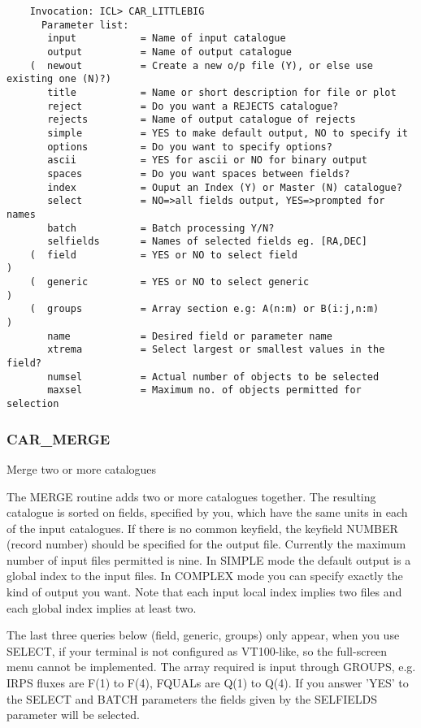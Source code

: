 \begin{verbatim}
    Invocation: ICL> CAR_LITTLEBIG
      Parameter list:
       input           = Name of input catalogue
       output          = Name of output catalogue
    (  newout          = Create a new o/p file (Y), or else use existing one (N)?)
       title           = Name or short description for file or plot
       reject          = Do you want a REJECTS catalogue?
       rejects         = Name of output catalogue of rejects
       simple          = YES to make default output, NO to specify it
       options         = Do you want to specify options?
       ascii           = YES for ascii or NO for binary output
       spaces          = Do you want spaces between fields?
       index           = Ouput an Index (Y) or Master (N) catalogue?
       select          = NO=>all fields output, YES=>prompted for names
       batch           = Batch processing Y/N?
       selfields       = Names of selected fields eg. [RA,DEC]
    (  field           = YES or NO to select field                               )
    (  generic         = YES or NO to select generic                             )
    (  groups          = Array section e.g: A(n:m) or B(i:j,n:m)                 )
       name            = Desired field or parameter name
       xtrema          = Select largest or smallest values in the field?
       numsel          = Actual number of objects to be selected
       maxsel          = Maximum no. of objects permitted for selection
\end{verbatim}

\subsubsection{CAR\_MERGE}

Merge two or more catalogues

The MERGE routine adds two or more catalogues together.
The resulting catalogue is sorted on fields, specified by you, which
have the same units in each of the input catalogues.
If there is no common keyfield, the keyfield NUMBER (record number) should
be specified for the output file.
Currently the maximum number of input files permitted is nine.
In SIMPLE mode the default output is a global index to the input files.
In COMPLEX mode you can specify exactly the kind of output you want.
Note that each input local index implies two files and each global index
implies at least two.

The last three queries below (field, generic, groups) only appear, when you use
SELECT, if your terminal is not configured as VT100-like, so the full-screen
menu cannot be implemented.
The array required is input through GROUPS, e.g. IRPS fluxes are F(1) to
F(4), FQUALs are Q(1) to Q(4).
If you answer 'YES' to the SELECT and BATCH parameters the fields given by the
SELFIELDS parameter will be selected.

